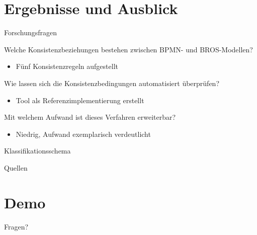 \section{Ergebnisse und Ausblick}

\begin{frame}{Forschungsfragen}
  \begin{description}[4cm]
    \item[F1] Welche Konsistenzbeziehungen bestehen zwischen BPMN- und BROS-Modellen?
    \begin{itemize}
      \item Fünf Konsistenzregeln aufgestellt
    \end{itemize}

    \item[F2] Wie lassen sich die Konsistenzbedingungen automatisiert überprüfen?
    \begin{itemize}
      \item Tool als Referenzimplementierung erstellt
    \end{itemize}

    \item[F3] Mit welchem Aufwand ist dieses Verfahren erweiterbar?
    \begin{itemize}
      \item Niedrig, Aufwand exemplarisch verdeutlicht
    \end{itemize}
  \end{description}
\end{frame}

\begin{frame}{Klassifikationsschema}
  
\end{frame}

\begin{frame}[allowframebreaks]{Quellen}
  \printbibliography[heading=none]
\end{frame}

\section{Demo}

\begin{frame}[standout]
  Fragen?
\end{frame}
